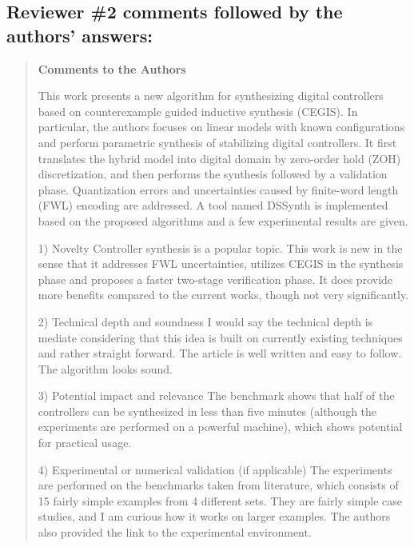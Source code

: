 \documentclass[11pt]{article}
\begin{document}


\newpage

\subsection*{Reviewer \#2 comments followed by the authors' answers:}
\begin{quote}

{\bf Comments to the Authors}

This work presents a new algorithm for synthesizing digital controllers based on counterexample guided inductive synthesis (CEGIS). In particular, the authors focuses on linear models with known configurations and perform parametric synthesis of stabilizing digital controllers. It first translates the hybrid model into digital domain by zero-order hold (ZOH) discretization, and then performs the synthesis followed by a validation phase. Quantization errors and uncertainties caused by finite-word length (FWL) encoding are addressed. A tool named DSSynth is implemented based on the proposed algorithms and a few experimental results are given.

1) Novelty
Controller synthesis is a popular topic. This work is new in the sense that it addresses FWL uncertainties, utilizes CEGIS in the synthesis phase and proposes a faster two-stage verification phase. It does provide more benefits compared to the current works, though not very significantly.

2) Technical depth and soundness 
I would say the technical depth is mediate considering that this idea is built on currently existing techniques and rather straight forward. The article is well written and easy to follow. The algorithm looks sound. 

3) Potential impact and relevance
The benchmark shows that half of the controllers can be synthesized in less than five minutes (although the experiments are performed on a powerful machine), which shows potential for practical usage.

4) Experimental or numerical validation (if applicable) 
The experiments are performed on the benchmarks taken from literature, which consists of 15 fairly simple examples from 4 different sets. They are fairly simple case studies, and I am curious how it works on larger examples. The authors also provided the link to the experimental environment.


\end{quote}
\end{document}
